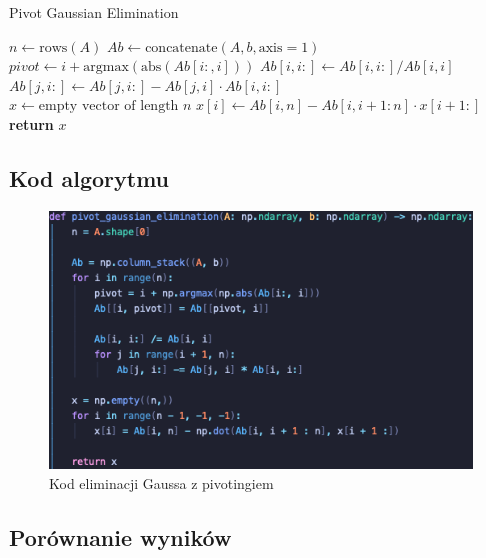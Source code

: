 \documentclass{article}
\begin{document}
\begin{algorithm}
\caption{Pivot Gaussian Elimination}
\begin{algorithmic}[1]
    \State $n \gets \text{rows}(A)$
    \State $Ab \gets \text{concatenate}(A, b, \text{axis}=1)$
    \\
        \State $pivot \gets i + \text{argmax}(\text{abs}(Ab[i:, i]))$
        \State $Ab[i, i:] \gets Ab[i, i:] / Ab[i, i]$
            \State $Ab[j, i:] \gets Ab[j, i:] - Ab[j, i] \cdot Ab[i, i:]$
        \EndFor
    \EndFor
    \\
    \State $x \gets \text{empty vector of length } n$
        \State $x[i] \gets Ab[i, n] - Ab[i, i+1 : n] \cdot x[i+1 :]$
    \EndFor
    \\
    \State \textbf{return} $x$
\EndProcedure
\end{algorithmic}
\end{algorithm}

\subsection{Kod algorytmu}

\begin{figure}[H]
  \centering
  \includegraphics[width=0.9\linewidth]{pivot_gaussian_elimination.png}
  \caption{Kod eliminacji Gaussa z pivotingiem}
  \label{fig:pivot_gaussian_elimination}
\end{figure}

\subsection{Porównanie wyników}
\end{document}
